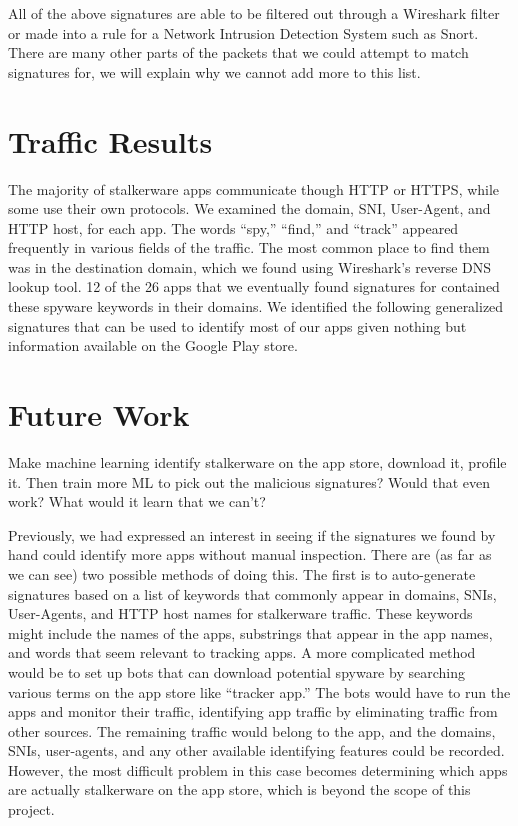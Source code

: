 \documentclass[acmtog]{acmart}
\begin{document}
All of the above signatures are able to be filtered out through a Wireshark filter or made into a rule for a Network Intrusion Detection System such as Snort. There are many other parts of the packets that we could attempt to match signatures for, we will explain why we cannot add more to this list.
\section{Traffic Results}

The majority of stalkerware apps communicate though HTTP or HTTPS, while some 
use their own protocols. We examined the domain, SNI, User-Agent, and HTTP 
host, for each app. The words “spy,” “find,” and “track” appeared frequently in 
various fields of the traffic. The most common place to find them was in the 
destination domain, which we found using Wireshark’s reverse DNS lookup tool. 
12 of the 26 apps that we eventually found signatures for contained these 
spyware keywords in their domains. We identified the following generalized 
signatures that can be used to identify most of our apps given nothing but 
information available on the Google Play store.


\section{Future Work}

Make machine learning identify stalkerware on the app store, download it, 
profile it. Then train more ML to pick out the malicious signatures? Would that 
even work? What would it learn that we can't?

Previously, we had expressed an interest in seeing if the signatures we found 
by hand could identify more apps without manual inspection. There are (as far 
as we can see) two possible methods of doing this. The first is to 
auto-generate signatures based on a list of keywords that commonly appear in 
domains, SNIs, User-Agents, and HTTP host names for stalkerware traffic. These 
keywords might include the names of the apps, substrings that appear in the app 
names, and words that seem relevant to tracking apps. A more complicated method 
would be to set up bots that can download potential spyware by searching 
various terms on the app store like “tracker app.” The bots would have to run 
the apps and monitor their traffic, identifying app traffic by eliminating 
traffic from other sources. The remaining traffic would belong to the app, and 
the domains, SNIs, user-agents, and any other available identifying features 
could be recorded. However, the most difficult problem in this case becomes 
determining which apps are actually stalkerware on the app store, which is 
beyond the scope of this project. 
\end{document}
